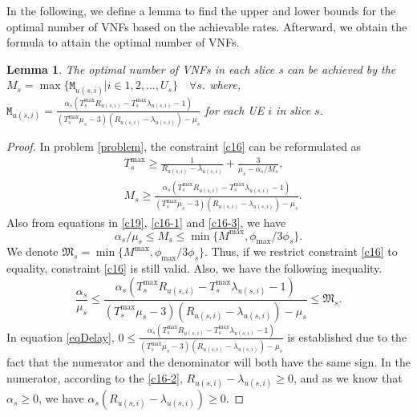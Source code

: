 \documentclass[lettersize,journal]{IEEEtran}
\newtheorem{lemma}{Lemma}
\begin{document}
In the following, we define a lemma to find the upper and lower bounds for the optimal number of VNFs based on the achievable rates. Afterward, we obtain the formula to attain the optimal number of VNFs.
\begin{lemma}\label{lemma1}
The optimal number of VNFs in each slice s can be achieved by the
$M_s = \max\{\mathtt{M}_{u(s,i)} | i \in 1,2,..., U_s\} \quad \forall s$.
where, $\mathtt{M}_{u(s,i)} = \frac{\alpha_s(T^{\text{max}}_s R_{u(s,i)}-T^{\text{max}}_s\lambda_{u(s,i)} -1)}{(T^{\text{max}}_s\mu_s-3)(R_{u(s,i)}-\lambda_{u(s,i)}) - \mu_s }$ for each UE $i$ in slice $s$.
\end{lemma}
\begin{proof}
In problem \eqref{problem}, the constraint \eqref{c16} can be reformulated as
\begin{subequations}
\begin{alignat}{4}
&T^{\max}_s \geq\frac{1}{R_{u(s,i)} - \lambda_{u(s,i)}} + \frac{3}{\mu_s - \alpha_{s}/{M_s}},  \\
&M_s \geq \frac{\alpha_s(T^{\max}_s R_{u(s,i)}-T^{\max}_s\lambda_{u(s,i)} -1)}{(T^{\max}_s\mu_s-3)(R_{u(s,i)}-\lambda_{u(s,i)}) - \mu_s }.
\end{alignat}
\end{subequations}
Also from equations in \eqref{c19}, \eqref{c16-1} and \eqref{c16-3}, we have
\begin{equation}
\alpha_s/\mu_s\leq M_s \leq \min\{M^{\max}, \phi_{\max}/{3\phi_s}\}.
\end{equation}
We denote $ \mathfrak{M}_s= \min\{M^{\max}, \phi_{\max}/{3\phi_s}\}$.
Thus, if we restrict constraint \eqref{c16} to equality, constraint \eqref{c16} is still valid.
Also, we have the following inequality.
\begin{equation}\label{eqDelay}
\frac{\alpha_s}{\mu_s} \leq \frac{\alpha_s(T^{\max}_s R_{u(s,i)}-T^{\max}_s\lambda_{u(s,i)} -1)}{(T^{\max}_s\mu_s-3)(R_{u(s,i)}-\lambda_{u(s,i)}) - \mu_s } \leq \mathfrak{M}_s.
\end{equation}
In equation \eqref{eqDelay}, $0\leq \frac{\alpha_s(T^{\max}_s R_{u(s,i)}-T^{\max}_s\lambda_{u(s,i)} -1)}{(T^{\max}_s\mu_s-3)(R_{u(s,i)}-\lambda_{u(s,i)}) - \mu_s }$ is established due to the fact that
the numerator and the denominator will both have the same sign.
In the numerator, according to the \eqref{c16-2}, $ R_{u(s,i)}-\lambda_{u(s,i)} \geq 0$, and as we know that $\alpha_s \geq 0$, we have $ \alpha_s (R_{u(s,i)}-\lambda_{u(s,i)}) \geq 0 $.

\end{proof}
\end{document}
